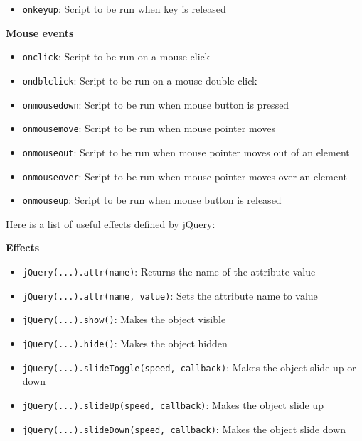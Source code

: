 \documentclass[justified,sixbynine,notoc]{tufte-book}
\def\ft{\small\tt}
\begin{document}
\begin{fullwidth}
\begin{itemize}
\item {\ft onkeyup}:    Script to be run when key is released
\end{itemize}

{\bf Mouse events}

\begin{itemize}
\item {\ft onclick}:     Script to be run on a mouse click

\item {\ft ondblclick}:  Script to be run on a mouse double-click

\item {\ft onmousedown}: Script to be run when mouse button is pressed

\item {\ft onmousemove}: Script to be run when mouse pointer moves

\item {\ft onmouseout}:  Script to be run when mouse pointer moves out of an element

\item {\ft onmouseover}: Script to be run when mouse pointer moves over an element

\item {\ft onmouseup}:   Script to be run when mouse button is released
\end{itemize}

Here is a list of useful effects defined by jQuery:

{\bf Effects}

\begin{itemize}
\item {\ft jQuery(...).attr(name)}: Returns the name of the attribute value

\item {\ft jQuery(...).attr(name, value)}: Sets the attribute name to value

\item {\ft jQuery(...).show()}: Makes the object visible

\item {\ft jQuery(...).hide()}: Makes the object hidden

\item {\ft jQuery(...).slideToggle(speed, callback)}: Makes the object slide up or down

\item {\ft jQuery(...).slideUp(speed, callback)}: Makes the object slide up

\item {\ft jQuery(...).slideDown(speed, callback)}: Makes the object slide down


\end{itemize}
\end{fullwidth}
\end{document}
